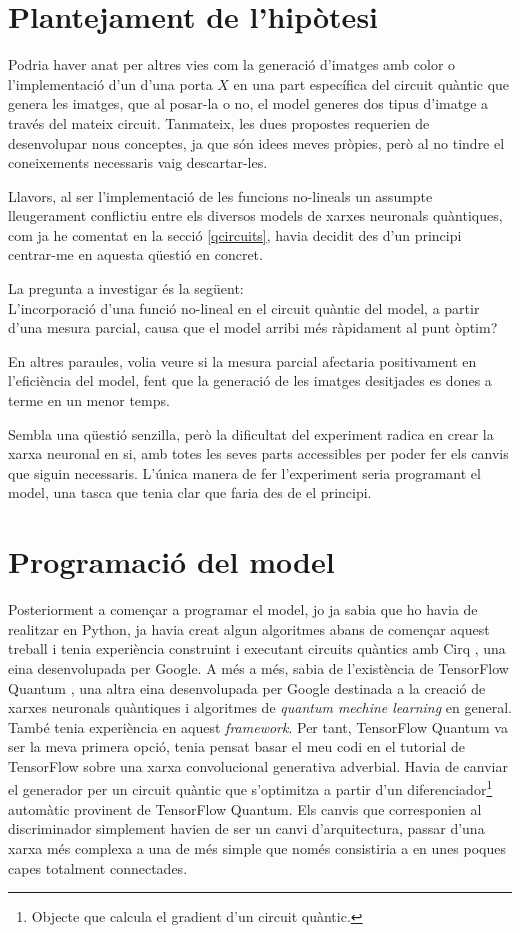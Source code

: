 \chapter{Plantejament de l'hipòtesi}

Podria haver anat per altres vies com la generació d'imatges amb color o l'implementació d'un d'una porta $X$ en una part específica del circuit quàntic que genera les imatges, que al posar-la o no, el model generes dos tipus d'imatge a través del mateix circuit. Tanmateix, les dues propostes requerien de desenvolupar nous conceptes, ja que són idees meves pròpies, però al no tindre el coneixements necessaris vaig descartar-les.

Llavors, al ser l'implementació de les funcions no-lineals un assumpte lleugerament conflictiu entre els diversos models de xarxes neuronals quàntiques, com ja he comentat en la secció \ref{qcircuits}, havia decidit des d'un principi centrar-me en aquesta qüestió en concret. 

La pregunta a investigar és la següent: \\
L'incorporació d'una funció no-lineal en el circuit quàntic del model, a partir d'una mesura parcial, causa que el model arribi més ràpidament al punt òptim?

En altres paraules, volia veure si la mesura parcial afectaria positivament en l'eficiència del model, fent que la generació de les imatges desitjades es dones a terme en un menor temps. 

Sembla una qüestió senzilla, però la dificultat del experiment radica en crear la xarxa neuronal en si, amb totes les seves parts accessibles per poder fer els canvis que siguin necessaris. L'única manera de fer l'experiment seria programant el model, una tasca que tenia clar que faria des de el principi.

\chapter{Programació del model}

Posteriorment a començar a programar el model, jo ja sabia que ho havia de realitzar en Python, ja havia creat algun algoritmes abans de començar aquest treball i tenia experiència construint i executant circuits quàntics amb Cirq \cite{cirq}, una eina desenvolupada per Google. A més a més, sabia de l'existència de TensorFlow Quantum \cite{tfq}, una altra eina desenvolupada per Google destinada a la creació de xarxes neuronals quàntiques i algoritmes de \textit{quantum mechine learning} en general. També tenia experiència en aquest \textit{framework}. Per tant, TensorFlow Quantum va ser la meva primera opció, tenia pensat basar el meu codi en el tutorial de TensorFlow sobre una xarxa convolucional generativa adverbial. Havia de canviar el generador per un circuit quàntic que s'optimitza a partir d'un diferenciador\footnote{Objecte que calcula el gradient d'un circuit quàntic.} automàtic provinent de TensorFlow Quantum. Els canvis que corresponien al discriminador simplement havien de ser un canvi d'arquitectura, passar d'una xarxa més complexa a una de més simple que només consistiria a en unes poques capes totalment connectades. 

